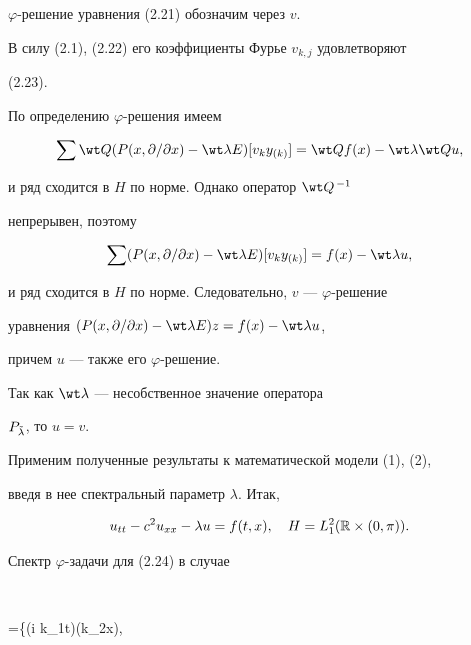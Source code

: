 \begin{pf} 


$\varphi$-решение уравнения (2.21) обозначим через $v$.  


В силу (2.1), (2.22) его коэффициенты Фурье $v_{k,j}$ удовлетворяют 


(2.23). 


По определению $\varphi$-решения имеем 


$$ 


\sum\wt Q(P(x,\partial/\partial x)-\wt\lambda E)[v_k y_{(k)}]= 


\wt Q f(x)-\wt\lambda\wt Q u, 


$$ 


и ряд сходится в $H$ по норме. Однако оператор $\wt Q^{\,-1}$ 


непрерывен, поэтому 


$$ 


\sum(P(x,\partial/\partial x)-\wt\lambda E)[v_k y_{(k)}]= 


f(x)-\wt\lambda u, 


$$ 


и ряд сходится в $H$ по норме. Следовательно, $v$ --- $\varphi$-решение 


уравнения $(P(x,\partial/\partial x)-\wt\lambda E)z=f(x)-\wt\lambda u$, 


причем $u$ --- также его $\varphi$-решение. 


Так как $\wt\lambda$ --- несобственное значение оператора 


$P_{\Tilde\lambda}$, то $u=v$. 


\end{pf} 


 


Применим полученные результаты к математической модели (1), (2), 


введя в нее спектральный параметр $\lambda$. Итак, 


\begin{equation} 


u_{tt}-c^2u_{xx}-\lambda u=f(t,x),\quad 


H=L^2_1(\Bbb R\times(0,\pi)). 


\end{equation} 


 


Спектр $\varphi$-задачи для (2.24) в случае 


$$ 


\varphi=\big\{\exp(i k_1t)\sin(k_2x), 


